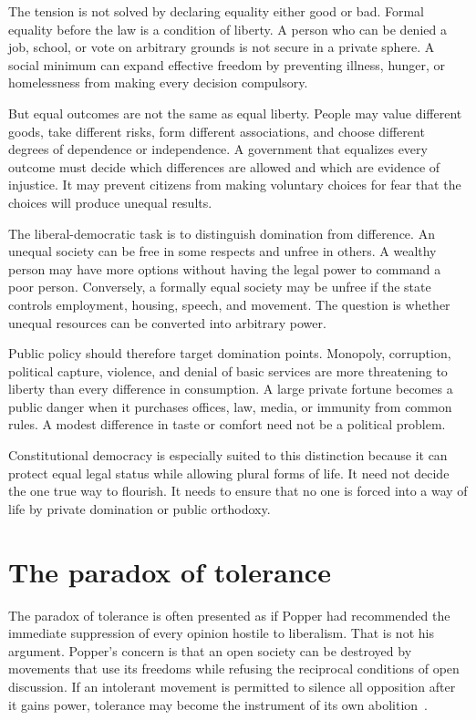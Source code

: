 ﻿\documentclass[12pt,a4paper]{book}
\begin{document}
The tension is not solved by declaring equality either good or bad.  Formal
equality before the law is a condition of liberty.  A person who can be
denied a job, school, or vote on arbitrary grounds is not secure in a
private sphere.  A social minimum can expand effective freedom by preventing
illness, hunger, or homelessness from making every decision compulsory.

But equal outcomes are not the same as equal liberty.  People may value
different goods, take different risks, form different associations, and
choose different degrees of dependence or independence.  A government that
equalizes every outcome must decide which differences are allowed and which
are evidence of injustice.  It may prevent citizens from making voluntary
choices for fear that the choices will produce unequal results.

The liberal-democratic task is to distinguish domination from difference.
An unequal society can be free in some respects and unfree in others.  A
wealthy person may have more options without having the legal power to
command a poor person.  Conversely, a formally equal society may be unfree
if the state controls employment, housing, speech, and movement.  The
question is whether unequal resources can be converted into arbitrary power.

Public policy should therefore target domination points.  Monopoly,
corruption, political capture, violence, and denial of basic services are
more threatening to liberty than every difference in consumption.  A large
private fortune becomes a public danger when it purchases offices, law,
media, or immunity from common rules.  A modest difference in taste or
comfort need not be a political problem.

Constitutional democracy is especially suited to this distinction because it
can protect equal legal status while allowing plural forms of life.  It need
not decide the one true way to flourish.  It needs to ensure that no one is
forced into a way of life by private domination or public orthodoxy.

\section{The paradox of tolerance}

The paradox of tolerance is often presented as if Popper had recommended
the immediate suppression of every opinion hostile to liberalism.  That is
not his argument.  Popper's concern is that an open society can be destroyed
by movements that use its freedoms while refusing the reciprocal conditions
of open discussion.  If an intolerant movement is permitted to silence all
opposition after it gains power, tolerance may become the instrument of its
own abolition~\cite{Popper-TOSAIE}.
\end{document}
